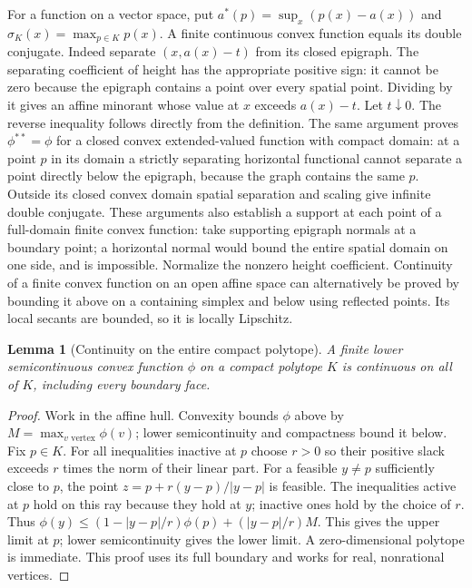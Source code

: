 \documentclass[11pt]{article}
\newtheorem{lemma}[theorem]{Lemma}
\theoremstyle{definition}\newtheorem{definition}[theorem]{Definition}
\theoremstyle{remark}\newtheorem{remark}[theorem]{Remark}
\begin{document}
For a function on a vector space, put $a^*(p)=\sup_x(p(x)-a(x))$ and $\sigma_K(x)=\max_{p\in K}p(x)$. A finite continuous convex function equals its double conjugate. Indeed separate $(x,a(x)-t)$ from its closed epigraph. The separating coefficient of height has the appropriate positive sign: it cannot be zero because the epigraph contains a point over every spatial point. Dividing by it gives an affine minorant whose value at $x$ exceeds $a(x)-t$. Let $t\downarrow0$. The reverse inequality follows directly from the definition. The same argument proves $\phi^{**}=\phi$ for a closed convex extended-valued function with compact domain: at a point $p$ in its domain a strictly separating horizontal functional cannot separate a point directly below the epigraph, because the graph contains the same $p$. Outside its closed convex domain spatial separation and scaling give infinite double conjugate. These arguments also establish a support at each point of a full-domain finite convex function: take supporting epigraph normals at a boundary point; a horizontal normal would bound the entire spatial domain on one side, and is impossible. Normalize the nonzero height coefficient. Continuity of a finite convex function on an open affine space can alternatively be proved by bounding it above on a containing simplex and below using reflected points. Its local secants are bounded, so it is locally Lipschitz.

\begin{lemma}[Continuity on the entire compact polytope]\label{boundary}
A finite lower semicontinuous convex function $\phi$ on a compact polytope $K$ is continuous on all of $K$, including every boundary face.
\end{lemma}
\begin{proof}
Work in the affine hull. Convexity bounds $\phi$ above by $M=\max_{v\text{ vertex}}\phi(v)$; lower semicontinuity and compactness bound it below. Fix $p\in K$. For all inequalities inactive at $p$ choose $r>0$ so their positive slack exceeds $r$ times the norm of their linear part. For a feasible $y\ne p$ sufficiently close to $p$, the point $z=p+r(y-p)/|y-p|$ is feasible. The inequalities active at $p$ hold on this ray because they hold at $y$; inactive ones hold by the choice of $r$. Thus
$\phi(y)\leq(1-|y-p|/r)\phi(p)+(|y-p|/r)M$.
This gives the upper limit at $p$; lower semicontinuity gives the lower limit. A zero-dimensional polytope is immediate. This proof uses its full boundary and works for real, nonrational vertices.
\end{proof}
\end{document}
